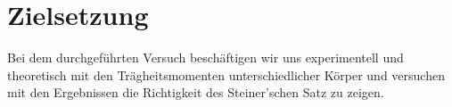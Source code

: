 \section{Zielsetzung}
Bei dem durchgeführten Versuch beschäftigen wir uns experimentell und theoretisch mit den Trägheitsmomenten unterschiedlicher Körper
und versuchen mit den Ergebnissen die Richtigkeit des Steiner'schen Satz zu zeigen. 